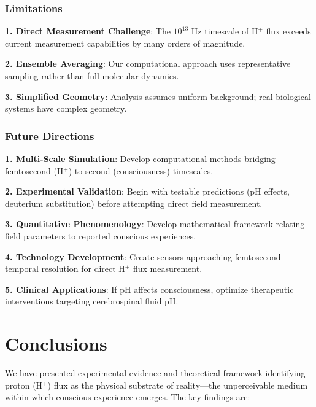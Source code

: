 \documentclass[12pt,a4paper]{article}
\begin{document}
\subsubsection{Limitations}

\textbf{1. Direct Measurement Challenge}: The $10^{13}$ Hz timescale of H$^+$ flux exceeds current measurement capabilities by many orders of magnitude.

\textbf{2. Ensemble Averaging}: Our computational approach uses representative sampling rather than full molecular dynamics.

\textbf{3. Simplified Geometry}: Analysis assumes uniform background; real biological systems have complex geometry.

\subsubsection{Future Directions}

\textbf{1. Multi-Scale Simulation}: Develop computational methods bridging femtosecond (H$^+$) to second (consciousness) timescales.

\textbf{2. Experimental Validation}: Begin with testable predictions (pH effects, deuterium substitution) before attempting direct field measurement.

\textbf{3. Quantitative Phenomenology}: Develop mathematical framework relating field parameters to reported conscious experiences.

\textbf{4. Technology Development}: Create sensors approaching femtosecond temporal resolution for direct H$^+$ flux measurement.

\textbf{5. Clinical Applications}: If pH affects consciousness, optimize therapeutic interventions targeting cerebrospinal fluid pH.

\section{Conclusions}

We have presented experimental evidence and theoretical framework identifying proton (H$^+$) flux as the physical substrate of reality—the unperceivable medium within which conscious experience emerges. The key findings are:
\end{document}
